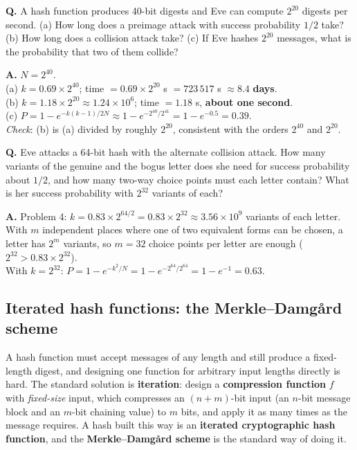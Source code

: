 \begin{worked}
\textbf{Q.} A hash function produces 40-bit digests and Eve can compute $2^{20}$ digests per second. (a) How long does a preimage attack with success probability $1/2$ take? (b) How long does a collision attack take? (c) If Eve hashes $2^{20}$ messages, what is the probability that two of them collide?

\textbf{A.} $N = 2^{40}$.\\
(a) $k = 0.69 \times 2^{40}$; time $= 0.69 \times 2^{20}$ s $= 723\,517$ s $\approx \mathbf{8.4}$ \textbf{days}.\\
(b) $k = 1.18 \times 2^{20} \approx 1.24 \times 10^{6}$; time $= 1.18$ s, \textbf{about one second}.\\
(c) $P = 1 - e^{-k(k-1)/2N} \approx 1 - e^{-2^{40}/2^{41}} = 1 - e^{-0.5} = \mathbf{0.39}$.\\
\emph{Check}: (b) is (a) divided by roughly $2^{20}$, consistent with the orders $2^{40}$ and $2^{20}$.
\end{worked}

\begin{worked}
\textbf{Q.} Eve attacks a 64-bit hash with the alternate collision attack. How many variants of the genuine and the bogus letter does she need for success probability about $1/2$, and how many two-way choice points must each letter contain? What is her success probability with $2^{32}$ variants of each?

\textbf{A.} Problem 4: $k = 0.83 \times 2^{64/2} = 0.83 \times 2^{32} \approx 3.56 \times 10^{9}$ variants of each letter. With $m$ independent places where one of two equivalent forms can be chosen, a letter has $2^m$ variants, so $m = 32$ choice points per letter are enough ($2^{32} > 0.83 \times 2^{32}$).\\
With $k = 2^{32}$: $P = 1 - e^{-k^2/N} = 1 - e^{-2^{64}/2^{64}} = 1 - e^{-1} = \mathbf{0.63}$.
\end{worked}

\subsection{Iterated hash functions: the Merkle--Damg\aa rd scheme \new}

A hash function must accept messages of any length and still produce a fixed-length digest, and designing one function for arbitrary input lengths directly is hard. The standard solution is \textbf{iteration}: design a \textbf{compression function} $f$ with \emph{fixed-size} input, which compresses an $(n + m)$-bit input (an $n$-bit message block and an $m$-bit chaining value) to $m$ bits, and apply it as many times as the message requires. A hash built this way is an \textbf{iterated cryptographic hash function}, and the \textbf{Merkle--Damg\aa rd scheme} is the standard way of doing it.

